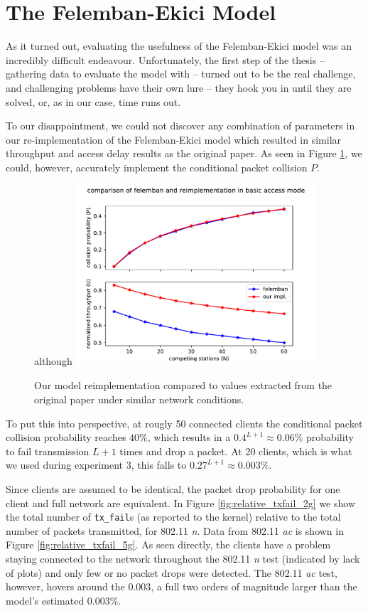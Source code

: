 \section{The Felemban-Ekici Model}

As it turned out, evaluating the usefulness of the Felemban-Ekici model was an
incredibly difficult endeavour. Unfortunately, the first step of the thesis --
gathering data to evaluate the model with -- turned out to be the real
challenge, and challenging problems have their own lure -- they hook you in
until they are solved, or, as in our case, time runs out.

To our disappointment, we could not discover any combination of parameters in
our re-implementation of the Felemban-Ekici model which resulted in similar
throughput and access delay results as the original paper. As seen in Figure
\ref{fig:modelimpl}, we could, however, accurately implement the conditional
packet collision $P$.

\begin{figure}[tbp]although
  \centering
  \includegraphics[width=0.8\textwidth]{images/reimpl.pdf}
  \caption{Our model reimplementation compared to values extracted from the original paper under similar network conditions.}
  \label{fig:modelimpl}
\end{figure}

To put this into perspective, at rougly 50 connected clients the conditional
packet collision probability reaches $40\%$, which results in a $0.4^{L+1}
\approx 0.06\%$ probability to fail transmission $L+1$ times and drop a
packet. At 20 clients, which is what we used during experiment 3, this falls
to $0.27^{L+1} \approx 0.003\%$.

Since clients are assumed to be identical, the packet drop probability for one
client and full network are equivalent. In Figure \ref{fig:relative_txfail_2g}
we show the total number of \texttt{tx\_fail}s (as reported to the kernel)
relative to the total number of packets transmitted, for 802.11 \emph{n}. Data
from 802.11 \emph{ac} is shown in Figure \ref{fig:relative_txfail_5g}. As seen
directly, the clients have a problem staying connected to the network throughout
the 802.11 \emph{n} test (indicated by lack of plots) and only few or no
packet drops were detected. The 802.11 \emph{ac} test, however, hovers around
the $0.003$, a full two orders of magnitude larger than the model's estimated
$0.003\%$.

